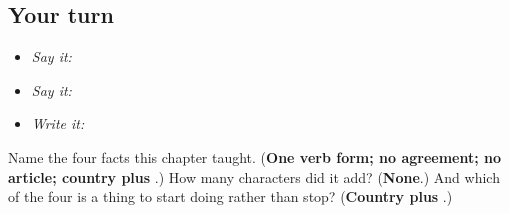 \subsection*{Your turn}
\begin{itemize}
\raggedright
  \item \emph{Say it:} 
  \item \emph{Say it:} 
  \item \emph{Write it:} 
\end{itemize}

\begin{tcolorbox}[breakable,colback=teal!4,colframe=teal!35!black,title={Before you move on}]
Name the four facts this chapter taught. (\textbf{One verb form; no agreement; no article; country plus }.) How many characters did it add? (\textbf{None}.) And which of the four is a thing to start doing rather than stop? (\textbf{Country plus }.)
\end{tcolorbox}

